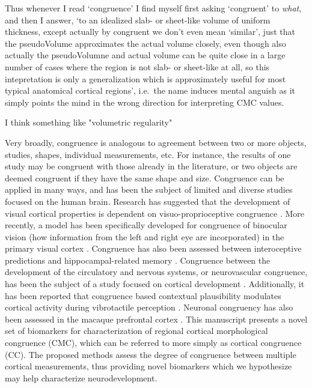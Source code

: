 \documentclass{article}
\begin{document}
Thus whenever I read `congruence' I find myself first asking `congruent' to
\emph{what}, and then I answer, `to an idealized slab- or sheet-like volume
of uniform thickness, except actually by congruent we don't even mean
`similar', just that the pseudoVolume approximates the actual volume closely, even though
also actually the pseudoVolumne and actual volume can be quite close in a
large number of cases where the region is not slab- or sheet-like at all, so
this intepretation is only a generalization which is approximately useful for
most typical anatomical cortical regions', i.e.\ the name induces mental anguish
as it simply points the mind in the wrong direction for interpreting CMC values.

I think something like "volumetric regularity"

\color{black}



Very broadly, congruence is analogous to agreement between two or more
objects, studies, shapes, individual measurements, etc. For instance, the
results of one study may be congruent with those already in the literature,
or two objects are deemed congruent if they have the same shape and size.
Congruence can be applied in many ways, and has been the subject of limited
and diverse studies focused on the human brain. Research has suggested that
the development of visual cortical properties is dependent on
visuo-proprioceptive congruence \citep{buisseretChapter22Development1993}.
More recently, a model has been specifically developed for congruence of
binocular vision (how information from the left and right eye are
incorporated) in the primary visual cortex
\citep{somaratnaModelDevelopmentBinocular2022}. Congruence has also been
assessed between interoceptive predictions and hippocampal-related memory
\citep{edwards-duricCongruenceInteroceptivePredictions2020}. Congruence
between the development of the circulatory and nervous systems, or
neurovascular congruence, has been the subject of a study focused on cortical
development \citep{stubbsNeurovascularCongruenceCerebral2009}. Additionally,
it has been reported that congruence based contextual plausibility modulates
cortical activity during vibrotactile perception
\citep{kangCongruencebasedContextualPlausibility2022}. Neuronal congruency
has also been assessed in the macaque prefrontal cortex
\citep{yaoNeuronalCongruencyEffects2022}. This manuscript presents a novel
set of biomarkers for characterization of regional cortical morphological
congruence (CMC), which can be referred to more simply as cortical congruence
(CC). The proposed methods assess the degree of congruence between multiple
cortical measurements, thus providing novel biomarkers which we hypothesize
may help characterize neurodevelopment.
\end{document}
